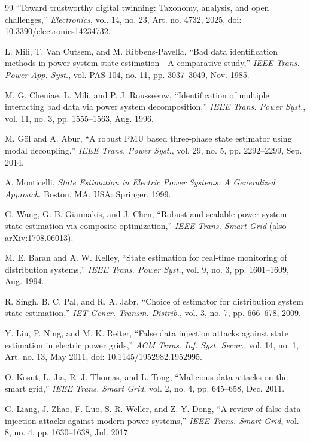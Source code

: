 \documentclass[journal]{IEEEtran}
\theoremstyle{plain}
\theoremstyle{definition}
\theoremstyle{remark}
\begin{document}
\begin{thebibliography}{99}
 ``Toward trustworthy digital twinning: Taxonomy, analysis, and open challenges,'' \emph{Electronics}, vol. 14, no. 23, Art. no. 4732, 2025, doi: 10.3390/electronics14234732.

 L. Mili, T. Van Cutsem, and M. Ribbens-Pavella, ``Bad data identification methods in power system state estimation---A comparative study,'' \emph{IEEE Trans. Power App. Syst.}, vol. PAS-104, no. 11, pp. 3037--3049, Nov. 1985.

 M. G. Cheniae, L. Mili, and P. J. Rousseeuw, ``Identification of multiple interacting bad data via power system decomposition,'' \emph{IEEE Trans. Power Syst.}, vol. 11, no. 3, pp. 1555--1563, Aug. 1996.

 M. G\"{o}l and A. Abur, ``A robust PMU based three-phase state estimator using modal decoupling,'' \emph{IEEE Trans. Power Syst.}, vol. 29, no. 5, pp. 2292--2299, Sep. 2014.

 A. Monticelli, \emph{State Estimation in Electric Power Systems: A Generalized Approach}. Boston, MA, USA: Springer, 1999.

 G. Wang, G. B. Giannakis, and J. Chen, ``Robust and scalable power system state estimation via composite optimization,'' \emph{IEEE Trans. Smart Grid} (also arXiv:1708.06013).

 M. E. Baran and A. W. Kelley, ``State estimation for real-time monitoring of distribution systems,'' \emph{IEEE Trans. Power Syst.}, vol. 9, no. 3, pp. 1601--1609, Aug. 1994.

 R. Singh, B. C. Pal, and R. A. Jabr, ``Choice of estimator for distribution system state estimation,'' \emph{IET Gener. Transm. Distrib.}, vol. 3, no. 7, pp. 666--678, 2009.

 Y. Liu, P. Ning, and M. K. Reiter, ``False data injection attacks against state estimation in electric power grids,'' \emph{ACM Trans. Inf. Syst. Secur.}, vol. 14, no. 1, Art. no. 13, May 2011, doi: 10.1145/1952982.1952995.

 O. Kosut, L. Jia, R. J. Thomas, and L. Tong, ``Malicious data attacks on the smart grid,'' \emph{IEEE Trans. Smart Grid}, vol. 2, no. 4, pp. 645--658, Dec. 2011.

 G. Liang, J. Zhao, F. Luo, S. R. Weller, and Z. Y. Dong, ``A review of false data injection attacks against modern power systems,'' \emph{IEEE Trans. Smart Grid}, vol. 8, no. 4, pp. 1630--1638, Jul. 2017.


\end{thebibliography}
\end{document}
